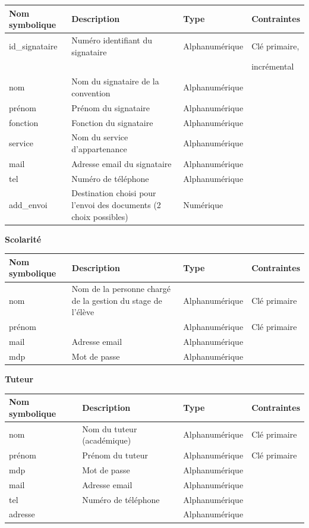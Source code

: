 \documentclass{scrreprt}
\begin{document}
\begin{tabular}{|l|p{6cm}|l|l|}
\hline
\textbf{Nom symbolique} & \textbf{Description} & \textbf{Type} & \textbf{Contraintes} \\
\hline
id\_signataire & Numéro identifiant du signataire & Alphanumérique & Clé primaire,\\
&&& incrémental \\
nom & Nom du signataire de la convention & Alphanumérique & \\
prénom & Prénom du signataire & Alphanumérique & \\
fonction & Fonction du signataire & Alphanumérique & \\
service & Nom du service d'appartenance & Alphanumérique & \\
mail & Adresse email du signataire & Alphanumérique & \\
tel & Numéro de téléphone & Alphanumérique & \\
add_envoi & Destination choisi pour l'envoi des documents (2 choix possibles) & Numérique &\\
\hline
\end{tabular}

\newpage
\begin{flushleft}
\textbf{Scolarité}
\end{flushleft}

\begin{tabular}{|l|p{6cm}|l|l|}
\hline
\textbf{Nom symbolique} & \textbf{Description} & \textbf{Type} & \textbf{Contraintes} \\
\hline
nom & Nom de la personne chargé de la gestion du stage de l'élève & Alphanumérique & Clé primaire \\
prénom & & Alphanumérique & Clé primaire \\
mail & Adresse email & Alphanumérique & \\
mdp & Mot de passe & Alphanumérique & \\
\hline
\end{tabular}

\begin{flushleft}
\textbf{Tuteur}
\end{flushleft}

\begin{tabular}{|l|l|l|l|}
\hline
\textbf{Nom symbolique} & \textbf{Description} & \textbf{Type} & \textbf{Contraintes} \\
\hline
nom & Nom du tuteur (académique) & Alphanumérique & Clé primaire \\
prénom & Prénom du tuteur & Alphanumérique & Clé primaire \\
mdp & Mot de passe & Alphanumérique & \\
mail & Adresse email & Alphanumérique & \\
tel & Numéro de téléphone & Alphanumérique & \\
adresse & & Alphanumérique & \\
\hline
\end{tabular}
\end{document}
